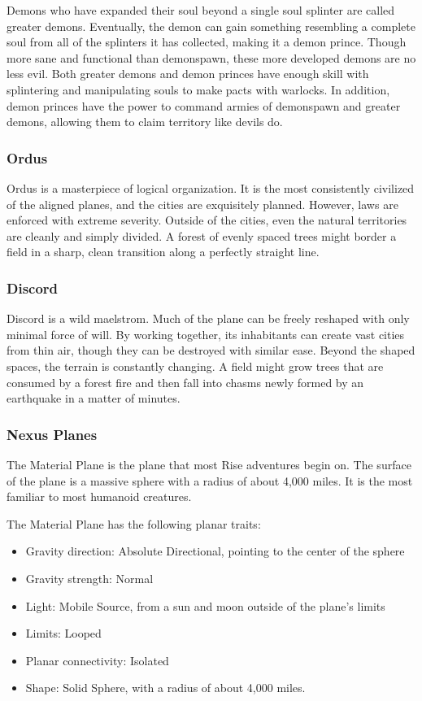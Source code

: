       Demons who have expanded their soul beyond a single soul splinter are called greater demons.
      Eventually, the demon can gain something resembling a complete soul from all of the splinters it has collected, making it a demon prince.
      Though more sane and functional than demonspawn, these more developed demons are no less evil.
      Both greater demons and demon princes have enough skill with splintering and manipulating souls to make pacts with warlocks.
      In addition, demon princes have the power to command armies of demonspawn and greater demons, allowing them to claim territory like devils do.

    \subsubsection{Ordus}
      Ordus is a masterpiece of logical organization.
      It is the most consistently civilized of the aligned planes, and the cities are exquisitely planned.
      However, laws are enforced with extreme severity.
      Outside of the cities, even the natural territories are cleanly and simply divided.
      A forest of evenly spaced trees might border a field in a sharp, clean transition along a perfectly straight line.

    \subsubsection{Discord}
      Discord is a wild maelstrom.
      Much of the plane can be freely reshaped with only minimal force of will.
      By working together, its inhabitants can create vast cities from thin air, though they can be destroyed with similar ease.
      Beyond the shaped spaces, the terrain is constantly changing.
      A field might grow trees that are consumed by a forest fire and then fall into chasms newly formed by an earthquake in a matter of minutes.

    \subsubsection{Nexus Planes}

      The Material Plane is the plane that most Rise adventures begin on.
      The surface of the plane is a massive sphere with a radius of about 4,000 miles.
      It is the most familiar to most humanoid creatures.

      The Material Plane has the following planar traits:
      \begin{itemize}
        \item Gravity direction: Absolute Directional, pointing to the center of the sphere
        \item Gravity strength: Normal
        \item Light: Mobile Source, from a sun and moon outside of the plane's limits
        \item Limits: Looped
        \item Planar connectivity: Isolated
        \item Shape: Solid Sphere, with a radius of about 4,000 miles.
      \end{itemize}

